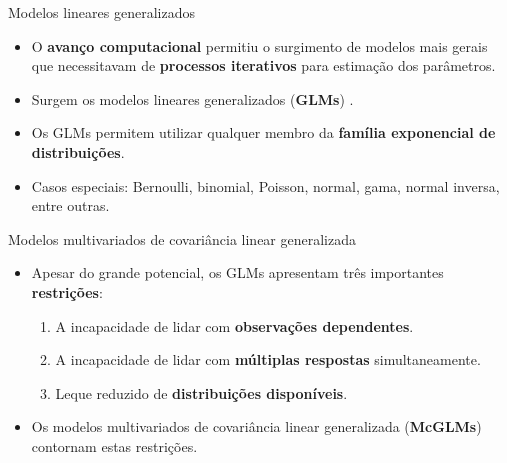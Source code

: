 \documentclass[
  ignorenonframetext,
  serif,
  professionalfont,
  usenames,
  dvipsnames,
  aspectratio = 169]{beamer}
\begin{document}
\begin{frame}{Modelos lineares generalizados}
\protect\hypertarget{modelos-lineares-generalizados}{}
\begin{itemize}
    \itemsep 2ex

  \item O \textbf{avanço computacional} permitiu o surgimento de modelos mais gerais que necessitavam de \textbf{processos iterativos} para estimação dos parâmetros. 
  
  \item Surgem os modelos lineares generalizados (\textbf{GLMs}) \citep{Nelder72}. 
  
  \item Os GLMs permitem utilizar qualquer membro da \textbf{família exponencial de distribuições}.

  \item Casos especiais: Bernoulli, binomial, Poisson, normal, gama, normal inversa, entre outras.
  
  \end{itemize}
\end{frame}

\begin{frame}{Modelos multivariados de covariância linear generalizada}
\protect\hypertarget{modelos-multivariados-de-covariuxe2ncia-linear-generalizada}{}
\begin{itemize}
    \itemsep 2ex
  
  \item Apesar do grande potencial, os GLMs apresentam três importantes \textbf{restrições}:
    \begin{enumerate}
      \itemsep 2ex
    
      \item A incapacidade de lidar com \textbf{observações dependentes}. 
      \item A incapacidade de lidar com \textbf{múltiplas respostas} simultaneamente.
      \item Leque reduzido de \textbf{distribuições disponíveis}. 
    \end{enumerate}

  \item Os modelos multivariados de covariância linear generalizada (\textbf{McGLMs}) \citep{Bonat16} contornam estas restrições.

  \end{itemize}
\end{frame}
\end{document}
